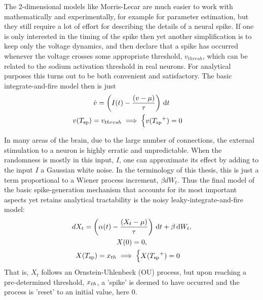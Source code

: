 The 2-dimensional models like Morris-Lecar are much easier to work with
mathematically and experimentally, for example for parameter estimation, but
they still require a lot of effort for describing the details of a neural spike.
If one is only interested in the timing of the spike then yet another
simplification is to keep only the voltage dynamics, and then declare
that a spike has occurred whenever the voltage crosses some appropriate threshold,
$v_{thresh}$, which can be related to the sodium activation threshold in real neurons. 
For analytical purposes this turns out to be both convenient and
satisfactory. The basic integrate-and-fire model then is just
\begin{equation}
\begin{gathered}
\dot{v} = \left(I(t) - \frac{(v - {\mu })}{{ \tau }} \right) \, \mathrm{d} t 
\\
v({ T_{\textrm{sp} } }) = v_{thresh} \implies  
\begin{cases}
v({ T_{\textrm{sp} } }^+) = 0 &  
\end{cases}
\end{gathered}
\label{eq:deterministic_IF}
\end{equation}

In many areas of the brain, due to the large number of connections, 
the external stimulation to a neuron is highly erratic and
unpredictable. When the randomness is mostly in this input, $I$,
one can approximate its effect by adding to the input $I$ a Gaussian white 
noise. In the terminology of this thesis, this is just a term proportional to
a Wiener process increment, $\beta dW_t$. 
Thus the final model of the basic spike-generation mechanism that accounts for
its most important aspects yet retains analytical tractability is the noisy
leaky-integrate-and-fire model:
\begin{equation}
\begin{gathered}
dX_t = \left(\alpha(t) - \frac{(X_t - {\mu })}{{ \tau }} \right) \, \mathrm{d} t + \beta \, \mathrm{d} W_t,
\\
X(0) = 0,
\\
X({ T_{\textrm{sp} } }) = { x_{th} } \implies  
\begin{cases}
X({ T_{\textrm{sp} } }^+) = 0 &  
\end{cases}
\end{gathered}
\label{eq:X_evolution_uo_math_ch}
\end{equation}
That is, $X_t$ follows an Ornstein-Uhlenbeck (OU) process, but upon reaching a pre-determined
threshold, ${ x_{th} }$, a 'spike' is deemed to have occurred and the process is
'reset' to an initial value, here $0$.

